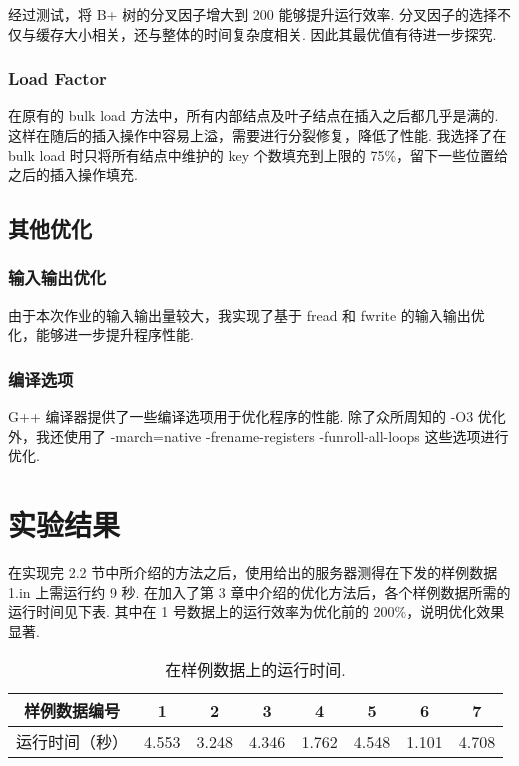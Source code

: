 \documentclass[10pt,letterpaper]{article}
\begin{document}
经过测试，将 B+ 树的分叉因子增大到 200 能够提升运行效率. 分叉因子的选择不仅与缓存大小相关，还与整体的时间复杂度相关. 因此其最优值有待进一步探究.

\subsubsection{Load Factor}

在原有的 bulk load 方法中，所有内部结点及叶子结点在插入之后都几乎是满的. 这样在随后的插入操作中容易上溢，需要进行分裂修复，降低了性能. 我选择了在 bulk load 时只将所有结点中维护的 key 个数填充到上限的 75\%，留下一些位置给之后的插入操作填充.

\subsection {其他优化}

\subsubsection{输入输出优化}

由于本次作业的输入输出量较大，我实现了基于 fread 和 fwrite 的输入输出优化，能够进一步提升程序性能.

\subsubsection{编译选项}

G++ 编译器提供了一些编译选项用于优化程序的性能. 除了众所周知的 -O3 优化外，我还使用了 -march=native -frename-registers -funroll-all-loops 这些选项进行优化.

\section {实验结果}

在实现完 2.2 节中所介绍的方法之后，使用给出的服务器测得在下发的样例数据 1.in 上需运行约 9 秒. 在加入了第 3 章中介绍的优化方法后，各个样例数据所需的运行时间见下表. 其中在 1 号数据上的运行效率为优化前的 200\%，说明优化效果显著.

\begin{table}[h!]
	\centering
\begin{tabular}{ |c||c|c|c|c|c|c|c|  }
	\hline
	样例数据编号&1&2&3&4&5&6&7\\
	\hline
	运行时间（秒）&4.553 & 3.248 & 4.346 & 1.762 & 4.548 & 1.101 & 4.708 \\
	\hline
   \end{tabular}
   \caption{在样例数据上的运行时间.}
   \label{table:1}
\end{table}
\end{document}
